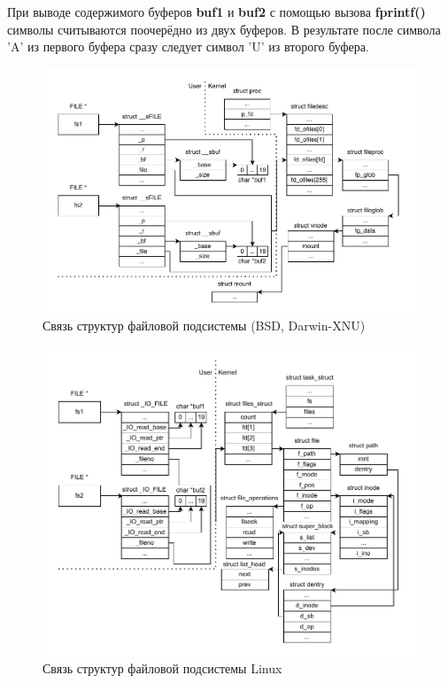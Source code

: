 При выводе содержимого буферов \textbf{buf1} и \textbf{buf2} с помощью вызова \textbf{fprintf()} символы считываются поочерёдно из двух буферов. В результате после символа 'A' из первого буфера сразу следует символ 'U' из второго буфера.

\begin{figure}[h!] 
	\centering
	\includegraphics[width=1.1\textwidth]{./img/first-01.pdf}
	\caption{Связь структур файловой подсистемы (BSD, Darwin-XNU)}
	\label{fig:2}
\end{figure}

\newpage
\begin{figure}[h!] 
	\centering
	\includegraphics[width=1.03\textwidth]{./img/first-02.pdf}
	\caption{Связь структур файловой подсистемы Linux}
	\label{fig:3}
\end{figure}

